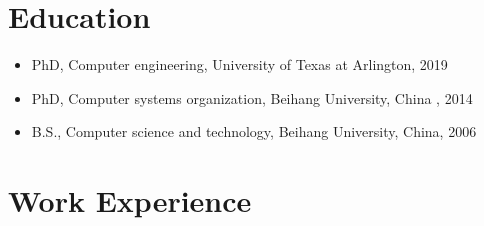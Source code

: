 \documentclass{article}
\begin{document}
\section{Education}
\begin{itemize}
\item PhD, Computer engineering,  University of Texas at Arlington, 2019
\item PhD, Computer systems organization, Beihang University, China , 2014
\item B.S., Computer science and technology, Beihang University, China,  2006
\end{itemize}


 
\section{Work Experience}
\end{document}
